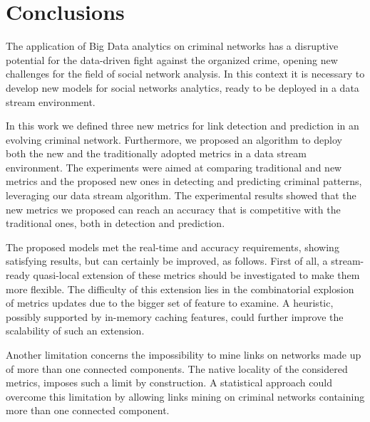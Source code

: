 \section{Conclusions}
\label{sec:conclusions}

The application of Big Data analytics on criminal networks has a disruptive potential for the data-driven fight against the organized crime, opening new challenges for the field of social network analysis. In this context it is necessary to develop new models for social networks analytics, ready to be deployed in a data stream environment. 

In this work we defined three new metrics for link detection and prediction in an evolving criminal network.
%
Furthermore, we proposed an algorithm to deploy both the new and the traditionally adopted metrics in a data stream environment.
%
The experiments were aimed at comparing traditional and new metrics and the proposed new ones in detecting and predicting criminal patterns, leveraging our data stream algorithm. 
%
The experimental results showed that the new metrics we proposed can reach an accuracy that is competitive with the traditional ones, both in detection and prediction.


The proposed models met the real-time and accuracy requirements, showing satisfying results, but can certainly be improved, as follows.
%
First of all, a stream-ready quasi-local extension of these metrics should be investigated to make them more flexible. 
%
The difficulty of this extension lies in the combinatorial explosion of metrics updates due to the bigger set of feature to examine.
%
A heuristic, possibly supported by in-memory caching features, could further improve the scalability of such an extension.

Another limitation concerns the impossibility to mine links on networks made up of more than one connected components. The native locality of the considered metrics, imposes such a limit by construction.
%
A statistical approach could overcome this limitation by allowing links mining on criminal networks containing more than one connected component. 

